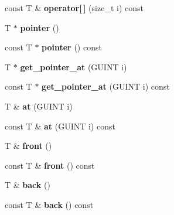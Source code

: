 \begin{DoxyCompactItemize}
\item 
\mbox{\label{classgim__array_a6df4e1f1223b8c7cb3cf2dc0039b7a55}} 
const T \& {\bfseries operator\mbox{[}$\,$\mbox{]}} (size\+\_\+t i) const
\item 
\mbox{\label{classgim__array_ad3e924dc4d51d64fd6b4a2ab2ffae793}} 
T $\ast$ {\bfseries pointer} ()
\item 
\mbox{\label{classgim__array_aefbe347f7417a9c5b8ebaa6989cce8bc}} 
const T $\ast$ {\bfseries pointer} () const
\item 
\mbox{\label{classgim__array_a8d24180b31e4b971b0b0d3ee07b0e0f0}} 
T $\ast$ {\bfseries get\+\_\+pointer\+\_\+at} (G\+U\+I\+NT i)
\item 
\mbox{\label{classgim__array_ad406b937dd8e791fbb8234cb92b3d943}} 
const T $\ast$ {\bfseries get\+\_\+pointer\+\_\+at} (G\+U\+I\+NT i) const
\item 
\mbox{\label{classgim__array_ae76ad8c556a353a67d4331a9def31676}} 
T \& {\bfseries at} (G\+U\+I\+NT i)
\item 
\mbox{\label{classgim__array_a6123b8cb4fc75751430778a4f2376627}} 
const T \& {\bfseries at} (G\+U\+I\+NT i) const
\item 
\mbox{\label{classgim__array_a60fc3e0355cfdc09cc169c1c595d5d1b}} 
T \& {\bfseries front} ()
\item 
\mbox{\label{classgim__array_a4a19fa926c2d9d8752c3ca73db8b3a17}} 
const T \& {\bfseries front} () const
\item 
\mbox{\label{classgim__array_aab58b1694b45fbd101c64258ac105669}} 
T \& {\bfseries back} ()
\item 
\mbox{\label{classgim__array_a5770ffb08d3c5e27e099d5809bb23a1b}} 
const T \& {\bfseries back} () const
\item 
\mbox{\label{classgim__array_a99a6869a790e5d746d455b56f1d65e32}} 

\end{DoxyCompactItemize}
